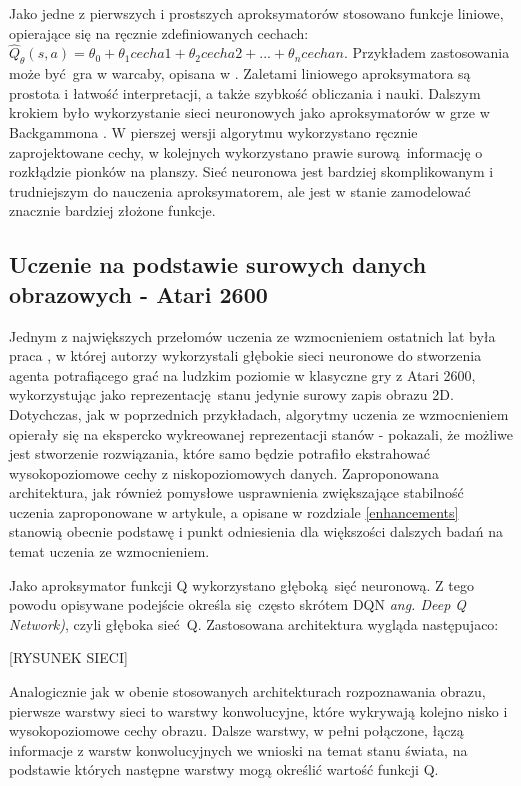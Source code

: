 Jako jedne z pierwszych i prostszych aproksymatorów stosowano funkcje liniowe, opierające się na ręcznie zdefiniowanych cechach: $\hat{Q}_{\theta}(s,a) = \theta_0 + \theta_1cecha1 + \theta_2cecha2 + ... + \theta_ncechan$. Przykładem zastosowania może być gra w warcaby, opisana w \cite{Samuel:1959:SML:1661923.1661924}. Zaletami liniowego aproksymatora są prostota i łatwość interpretacji, a także szybkość obliczania i nauki. 
Dalszym krokiem było wykorzystanie sieci neuronowych jako aproksymatorów w grze w Backgammona \cite{Tesauro1992451}. W pierszej wersji algorytmu wykorzystano ręcznie zaprojektowane cechy, w kolejnych wykorzystano prawie surową informację o rozkłądzie pionków na planszy. Sieć neuronowa jest bardziej skomplikowanym i trudniejszym do nauczenia aproksymatorem, ale jest w stanie zamodelować znacznie bardziej złożone funkcje.

\subsection{Uczenie na podstawie surowych danych obrazowych - Atari 2600}

Jednym z największych przełomów uczenia ze wzmocnieniem ostatnich lat była praca \cite{mnih2015human}, w której autorzy wykorzystali głębokie sieci neuronowe do stworzenia agenta potrafiącego grać na ludzkim poziomie w klasyczne gry z Atari 2600, wykorzystując jako reprezentację stanu jedynie surowy zapis obrazu 2D. Dotychczas, jak w poprzednich przykładach, algorytmy uczenia ze wzmocnieniem opierały się na ekspercko wykreowanej reprezentacji stanów - \cite{mnih2015human} pokazali, że możliwe jest stworzenie rozwiązania, które samo będzie potrafiło ekstrahować wysokopoziomowe cechy z niskopoziomowych danych. Zaproponowana architektura, jak również pomysłowe usprawnienia zwiększające stabilność uczenia zaproponowane w artykule, a opisane w rozdziale \ref {enhancements} stanowią obecnie podstawę i punkt odniesienia dla większości dalszych badań na temat uczenia ze wzmocnieniem.

Jako aproksymator funkcji Q wykorzystano głęboką sięć neuronową. Z tego powodu opisywane podejście określa się często skrótem DQN \textit{ang. Deep Q Network)}, czyli głęboka sieć Q. Zastosowana architektura wygląda następujaco:

[RYSUNEK SIECI]

Analogicznie jak w obenie stosowanych architekturach rozpoznawania obrazu, pierwsze warstwy sieci to warstwy konwolucyjne, które wykrywają kolejno nisko i wysokopoziomowe cechy obrazu. Dalsze warstwy, w pełni połączone, łączą informacje z warstw konwolucyjnych we wnioski na temat stanu świata, na podstawie których następne warstwy mogą określić wartość funkcji Q.


